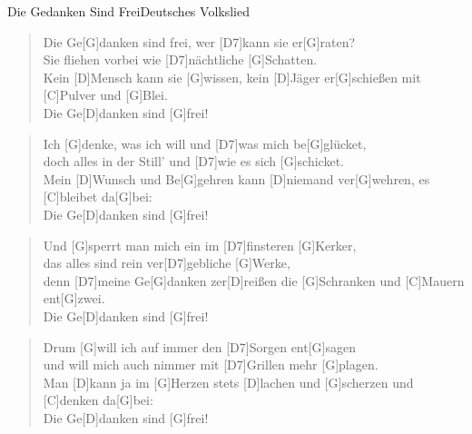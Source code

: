 \begin{song}{Die Gedanken Sind Frei}{Deutsches Volkslied}

    \begin{verse}  
        Die Ge[G]danken sind frei, wer [D7]kann sie er[G]raten? \\
        Sie fliehen vorbei wie [D7]nächtliche [G]Schatten. \\
        Kein [D]Mensch kann sie [G]wissen, kein [D]Jäger er[G]schießen
        mit [C]Pulver und [G]Blei. \\
        Die Ge[D]danken sind [G]frei!
    \end{verse}  

    \begin{verse}  
        Ich [G]denke, was ich will und [D7]was mich be[G]glücket,\\
        doch alles in der Still’
        und [D7]wie es sich [G]schicket.\\
        Mein [D]Wunsch und Be[G]gehren
        kann [D]niemand ver[G]wehren,
        es [C]bleibet da[G]bei:\\
        Die Ge[D]danken sind [G]frei!\\
    \end{verse}  

    \begin{verse}  
        Und [G]sperrt man mich ein
        im [D7]finsteren [G]Kerker, \\
        das alles sind rein
        ver[D7]gebliche [G]Werke, \\
        denn [D7]meine Ge[G]danken
        zer[D]reißen die [G]Schranken
        und [C]Mauern ent[G]zwei. \\
        Die Ge[D]danken sind [G]frei!
    \end{verse}  

    \begin{verse}  
        Drum [G]will ich auf immer
        den [D7]Sorgen ent[G]sagen \\
        und will mich auch nimmer
        mit [D7]Grillen mehr [G]plagen. \\
        Man [D]kann ja im [G]Herzen
        stets [D]lachen und [G]scherzen
        und [C]denken da[G]bei: \\
        Die Ge[D]danken sind [G]frei!
    \end{verse}  

\end{song}
